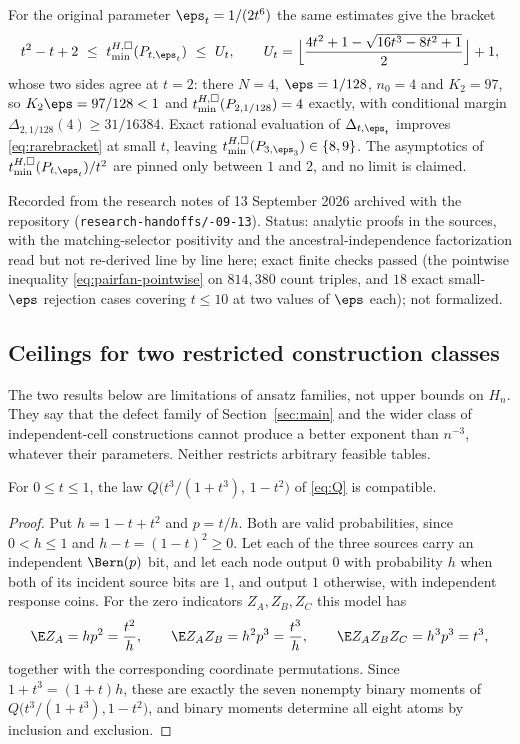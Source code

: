 For the original parameter $\eps_t=1/(2t^6)$ the same estimates give the bracket
\begin{equation}\label{eq:rarebracket}
t^2-t+2\ \le\ \tminsq H(P_{t,\eps_t})\ \le\ U_t,\qquad
U_t=\Bigl\lfloor\frac{4t^2+1-\sqrt{16t^3-8t^2+1}}2\Bigr\rfloor+1 ,
\end{equation}
whose two sides agree at $t=2$: there $N=4$, $\eps=1/128$, $n_0=4$ and $K_2=97$, so $K_2\eps=97/128<1$ and $t_{\min}^{H,\square}(P_{2,1/128})=4$ exactly, with conditional margin $\Delta_{2,1/128}(4)\ge31/16384$. Exact rational evaluation of $\Delta_{t,\eps_t}$ improves \eqref{eq:rarebracket} at small $t$, leaving $\tminsq H(P_{3,\eps_3})\in\{8,9\}$. The asymptotics of $\tminsq H(P_{t,\eps_t})/t^2$ are pinned only between $1$ and $2$, and no limit is claimed.

Recorded from the research notes of 13 September 2026 archived with the repository (\texttt{research-\allowbreak handoffs/-09-13}). Status: analytic proofs in the sources, with the matching-selector positivity and the ancestral-independence factorization read but not re-derived line by line here; exact finite checks passed (the pointwise inequality \eqref{eq:pairfan-pointwise} on $814{,}380$ count triples, and $18$ exact small-$\eps$ rejection cases covering $t\le10$ at two values of $\eps$ each); not formalized.

\subsection*{Ceilings for two restricted construction classes}

The two results below are limitations of ansatz families, not upper bounds on $H_n$. They say that the defect family of Section~\ref{sec:main} and the wider class of independent-cell constructions cannot produce a better exponent than $n^{-3}$, whatever their parameters. Neither restricts arbitrary feasible tables.

\begin{lemma}\label{lem:comparisoncurve}
For $0\le t\le1$, the law $Q\bigl(t^3/(1+t^3),\,1-t^2\bigr)$ of \eqref{eq:Q} is compatible.
\end{lemma}

\begin{proof}
Put $h=1-t+t^2$ and $p=t/h$. Both are valid probabilities, since $0<h\le1$ and $h-t=(1-t)^2\ge0$. Let each of the three sources carry an independent $\Bern(p)$ bit, and let each node output $0$ with probability $h$ when both of its incident source bits are $1$, and output $1$ otherwise, with independent response coins. For the zero indicators $Z_A,Z_B,Z_C$ this model has
\[
\E Z_A=hp^2=\frac{t^2}h,\qquad
\E Z_AZ_B=h^2p^3=\frac{t^3}h,\qquad
\E Z_AZ_BZ_C=h^3p^3=t^3,
\]
together with the corresponding coordinate permutations. Since $1+t^3=(1+t)h$, these are exactly the seven nonempty binary moments of $Q\bigl(t^3/(1+t^3),1-t^2\bigr)$, and binary moments determine all eight atoms by inclusion and exclusion.
\end{proof}

